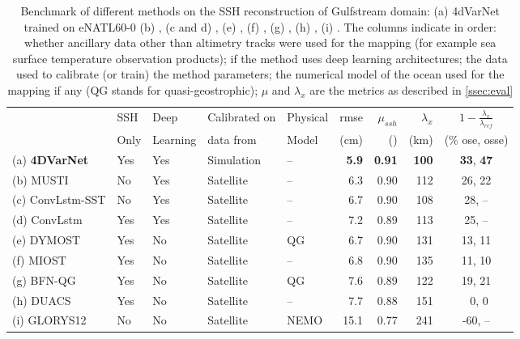 \begin{bibunit}
\begin{table}[h]
\hspace{-10mm}\begin{tabular}{l||llll|rrrc}
\toprule
 & SSH  & Deep  & Calibrated on  & Physical  & rmse & $\mu_{ssh}$  & $\lambda_x$ & $1 - \frac{\lambda_x}{\lambda_{ref}}$ \\
 &  Only &  Learning &  data from &  Model &  (cm) &  () &  (km) & (\% ose, osse) \\
\midrule
(a) \textbf{4DVarNet} &  Yes & Yes & Simulation  & -- & \textbf{5.9}  & \textbf{0.91}  & \textbf{100} & \textbf{33}, \textbf{47} \\
(b) MUSTI & No &  Yes & Satellite  & -- & 6.3  & 0.90  & 112 & 26, 22 \\
(c) ConvLstm-SST & No &  Yes & Satellite  & -- & 6.7  & 0.90  & 108 & 28, -- \\
(d) ConvLstm &  Yes &  Yes & Satellite  & -- & 7.2  & 0.89  & 113 & 25, -- \\
(e) DYMOST&  Yes & No & Satellite  & QG & 6.7  & 0.90  & 131 & 13, 11 \\
(f) MIOST &  Yes & No & Satellite  & -- & 6.8  & 0.90  & 135 & 11, 10 \\
(g) BFN-QG &  Yes & No & Satellite  & QG & 7.6  & 0.89  & 122 & 19, 21 \\
(h) DUACS &  Yes & No & Satellite  & -- & 7.7  & 0.88  & 151 &  ~0,  0 \\
(i) GLORYS12 & No & No & Satellite  & NEMO & 15.1  & 0.77  & 241 & -60, -- \\
\bottomrule
\end{tabular}
\caption{ Benchmark of different methods on the SSH reconstruction of Gulfstream domain: (a) 4dVarNet trained on eNATL60-0 (b) \cite{archambaultMultimodalUnsupervisedSpatioTemporal2023}, (c and d) \cite{martinSynthesizingSeaSurface2023}, (e) \cite{ballarottaDynamicMappingAlongTrack2020}, (f) \cite{ubelmannReconstructingOceanSurface2021}, (g) \cite{guillouMappingAltimetryForthcoming2021}, (h) \cite{taburetDUACSDT2018252019}, (i) \cite{jean-michelCopernicusGlobal122021}. The columns indicate in order: whether ancillary data other than altimetry tracks were used for the mapping (for example sea surface temperature observation products); if the method uses deep learning architectures; the data used to calibrate (or train) the method parameters; the numerical model of the ocean used for the mapping if any (QG stands for quasi-geostrophic); $\mu$ and $\lambda_x$ are the metrics as described in \ref{ssec:eval}}
\label{tab:bench}
\end{table}




\end{bibunit}
